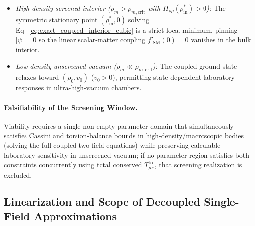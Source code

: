 \begin{enumerate}[leftmargin=2em]
  \begin{itemize}
    \item \emph{High-density screened interior ($\rho_m > \rho_{m,\mathrm{crit}}$ with $H_{\rho\rho}(\rho_{\mathrm{in}}^*) > 0$):} The symmetric stationary point $(\rho_{\mathrm{in}}^*, 0)$ solving Eq.~\eqref{eq:exact_coupled_interior_cubic} is a strict local minimum, pinning $|\psi| = 0$ so the linear scalar-matter coupling $f'_{\mathrm{SM}}(0) = 0$ vanishes in the bulk interior.
    \item \emph{Low-density unscreened vacuum ($\rho_m \ll \rho_{m,\mathrm{crit}}$):} The coupled ground state relaxes toward $(\rho_0, v_0)$ ($v_0 > 0$), permitting state-dependent laboratory responses in ultra-high-vacuum chambers.
  \end{itemize}
\end{enumerate}

\paragraph{Falsifiability of the Screening Window.}
Viability requires a single non-empty parameter domain that simultaneously satisfies Cassini and torsion-balance bounds in high-density/macroscopic bodies (solving the full coupled two-field equations) while preserving calculable laboratory sensitivity in unscreened vacuum; if no parameter region satisfies both constraints concurrently using total conserved $T_{\mu\nu}^{\mathrm{tot}}$, that screening realization is excluded.

\subsection{Linearization and Scope of Decoupled Single-Field Approximations}

